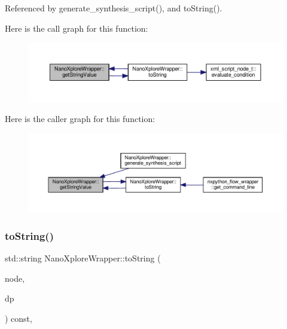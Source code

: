 Referenced by generate\+\_\+synthesis\+\_\+script(), and to\+String().

Here is the call graph for this function\+:
\nopagebreak
\begin{figure}[H]
\begin{center}
\leavevmode
\includegraphics[width=350pt]{da/d28/classNanoXploreWrapper_a88615cca1531c82e07e1ed0d4cc9a47e_cgraph}
\end{center}
\end{figure}
Here is the caller graph for this function\+:
\nopagebreak
\begin{figure}[H]
\begin{center}
\leavevmode
\includegraphics[width=350pt]{da/d28/classNanoXploreWrapper_a88615cca1531c82e07e1ed0d4cc9a47e_icgraph}
\end{center}
\end{figure}
\mbox{\label{classNanoXploreWrapper_ac21600c8f4e069a14f07a91560caf0c1}} 
\subsubsection{\texorpdfstring{to\+String()}{toString()}}
{\footnotesize\ttfamily std\+::string Nano\+Xplore\+Wrapper\+::to\+String (\begin{DoxyParamCaption}\item[{const \hyperlink{xml__script__command_8hpp_a1fe3d50ade66bc35e41be9b68bbbcd02}{xml\+\_\+script\+\_\+node\+\_\+t\+Ref}}]{node,  }\item[{const \hyperlink{DesignParameters_8hpp_ae36bb1c4c9150d0eeecfe1f96f42d157}{Design\+Parameters\+Ref}}]{dp }\end{DoxyParamCaption}) const\hspace{0.3cm}{\ttfamily [override]}, {\ttfamily [virtual]}}



